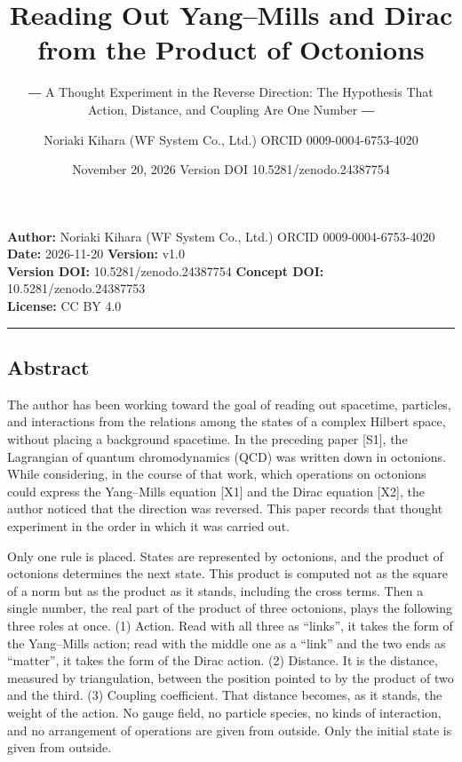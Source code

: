 \documentclass[
  a4paper,
]{article}
\title{Reading Out Yang--Mills and Dirac from the Product of Octonions}
\subtitle{― A Thought Experiment in the Reverse Direction: The
Hypothesis That Action, Distance, and Coupling Are One Number ―}
\author{Noriaki Kihara (WF System Co., Ltd.) ORCID 0009-0004-6753-4020}
\date{November 20, 2026 Version DOI 10.5281/zenodo.24387754}
\begin{document}
\maketitle

\textbf{Author:} Noriaki Kihara (WF System Co., Ltd.) ORCID
0009-0004-6753-4020\\
\textbf{Date:} 2026-11-20 \textbf{Version:} v1.0\\
\textbf{Version DOI:} 10.5281/zenodo.24387754 \textbf{Concept DOI:}
10.5281/zenodo.24387753\\
\textbf{License:} CC BY 4.0

\begin{center}\rule{0.5\linewidth}{0.5pt}\end{center}

\subsection{Abstract}\label{abstract}

The author has been working toward the goal of reading out spacetime,
particles, and interactions from the relations among the states of a
complex Hilbert space, without placing a background spacetime. In the
preceding paper {[}S1{]}, the Lagrangian of quantum chromodynamics (QCD)
was written down in octonions. While considering, in the course of that
work, which operations on octonions could express the Yang--Mills
equation {[}X1{]} and the Dirac equation {[}X2{]}, the author noticed
that the direction was reversed. This paper records that thought
experiment in the order in which it was carried out.

Only one rule is placed. States are represented by octonions, and the
product of octonions determines the next state. This product is computed
not as the square of a norm but as the product as it stands, including
the cross terms. Then a single number, the real part of the product of
three octonions, plays the following three roles at once. (1) Action.
Read with all three as ``links'', it takes the form of the Yang--Mills
action; read with the middle one as a ``link'' and the two ends as
``matter'', it takes the form of the Dirac action. (2) Distance. It is
the distance, measured by triangulation, between the position pointed to
by the product of two and the third. (3) Coupling coefficient. That
distance becomes, as it stands, the weight of the action. No gauge
field, no particle species, no kinds of interaction, and no arrangement
of operations are given from outside. Only the initial state is given
from outside.
\end{document}
